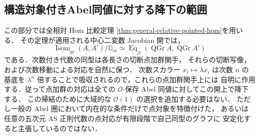\subsection{構造対象付きAbel同値に対する降下の範囲}


この部分では全相対 Hom 比較定理
\ref{thm:general-relative-pointed-hom}を用いる．
その定理が適用される中心二変数 Jacobian 開では，
\[
 \underline{\operatorname{Isom}}_{\mathrm{gr}}(A,A')/\mathbb G_m
 \simeq
 \underline{\operatorname{Eq}}_{\mathcal O}
       (\operatorname{QGr}A,\operatorname{QGr}A')
\]
である．次数付き代数の同型は各長さの切断点加群関手，
それらの切断写像，および次数移動による対応を自然に保つ．
次数スカラー $x_i\mapsto\lambda x_i$ は次数 $n$ の基底を
$\lambda^n$ 倍することで吸収されるので，これらの点加群関手上には
自明に作用する．従って点加群の対応は全ての
$\mathcal O$-保存 Abel 同値に対してこの開上で降下する．
この帰結のために大域的な $\mathcal O(1)$ の選択を追加する必要はない．
ただし一般の Abel 圏において内在的な条件だけで点対象を特徴付けた，
あるいは任意の五次元 AS 正則代数の点対応が有限段階で自己同型のグラフに
安定化すると主張しているのではない．


